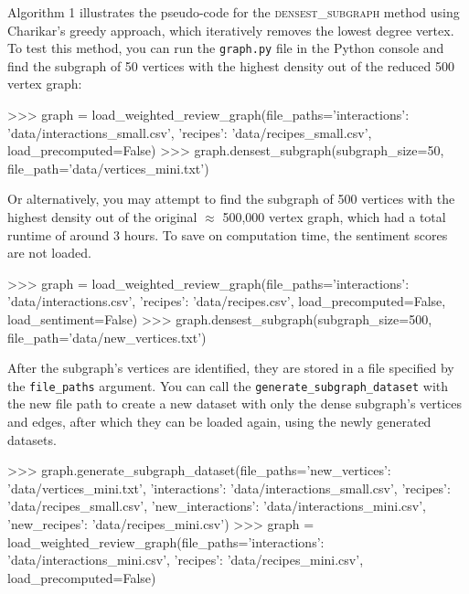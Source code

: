 \documentclass[fontsize=11pt]{article}
\begin{document}
Algorithm 1 illustrates the pseudo-code for the \textsc{densest\_subgraph} method using Charikar's greedy approach, which iteratively removes the lowest degree vertex. To test this method, you can run the \texttt{graph.py} file in the Python console and find the subgraph of 50 vertices with the highest density out of the reduced 500 vertex graph:
\begin{python}
>>> graph = load_weighted_review_graph(file_paths={'interactions': 'data/interactions_small.csv', 'recipes': 'data/recipes_small.csv'}, load_precomputed=False)
>>> graph.densest_subgraph(subgraph_size=50, file_path='data/vertices_mini.txt')
\end{python}
Or alternatively, you may attempt to find the subgraph of 500 vertices with the highest density out of the original $\approx$ 500,000 vertex graph, which had a total runtime of around 3 hours. To save on computation time, the sentiment scores are not loaded.
\begin{python}
>>> graph = load_weighted_review_graph(file_paths={'interactions': 'data/interactions.csv', 'recipes': 'data/recipes.csv'}, load_precomputed=False, load_sentiment=False)
>>> graph.densest_subgraph(subgraph_size=500, file_path='data/new_vertices.txt')
\end{python}
After the subgraph's vertices are identified, they are stored in a file specified by the \texttt{file\_paths} argument. You can call the \texttt{generate\_subgraph\_dataset} with the new file path to create a new dataset with only the dense subgraph's vertices and edges, after which they can be loaded again, using the newly generated datasets.
\begin{python}
>>> graph.generate_subgraph_dataset(file_paths={'new_vertices': 'data/vertices_mini.txt', 'interactions': 'data/interactions_small.csv', 'recipes': 'data/recipes_small.csv', 'new_interactions': 'data/interactions_mini.csv', 'new_recipes': 'data/recipes_mini.csv'})
>>> graph = load_weighted_review_graph(file_paths={'interactions': 'data/interactions_mini.csv', 'recipes': 'data/recipes_mini.csv'}, load_precomputed=False)
\end{python}
\end{document}
